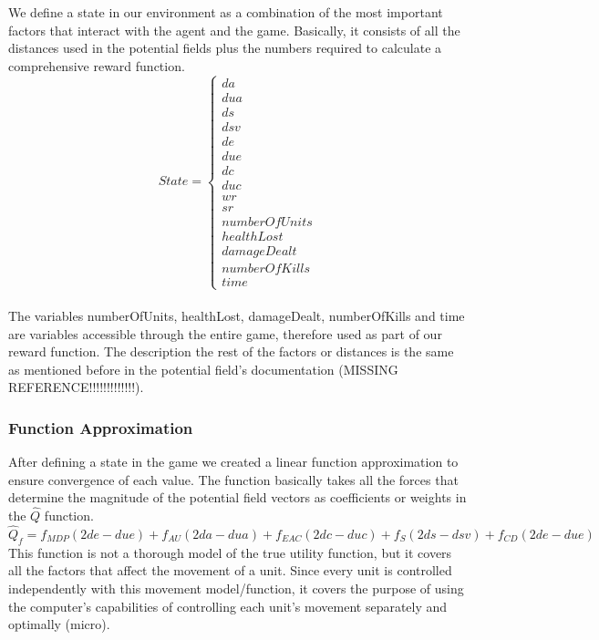 We define a state in our environment as a combination of the most important factors that interact with the agent and the game. Basically, it consists of all the distances used in the potential fields plus the numbers required to calculate a comprehensive reward function. \\
\begin{displaymath}
                       State = \begin{cases}
                         da \\  dua \\  ds \\  dsv \\ de \\ due \\ dc \\ duc \\ wr \\ sr \\ numberOfUnits \\ healthLost \\ damageDealt \\ numberOfKills \\ time
                      \end{cases}
\end{displaymath}\\

The variables numberOfUnits, healthLost, damageDealt, numberOfKills and time are variables accessible through the entire game, therefore used as part of our reward function. The description the rest of the factors or distances is the same as mentioned before in the potential field's documentation (MISSING REFERENCE!!!!!!!!!!!!!). 

\subsubsection{Function Approximation}

After defining a state in the game we created a linear function approximation to ensure convergence of each value. The function basically takes all the forces that determine the magnitude of the potential field vectors as coefficients or weights in the $\hat{Q}$ function. \\ 

$\hat{Q}_f = f_{MDP} (2de - due) + f_{AU} (2da - dua) + f_{EAC} (2dc - duc) + f_{S}  (2ds - dsv) + f_{CD} (2de - due)$ \\ 

This function is not a thorough model of the true utility function, but it covers all the factors that affect the movement of a unit. Since every unit is controlled independently with this movement model/function, it covers the purpose of using the computer's capabilities of controlling each unit's movement separately and optimally (micro).

